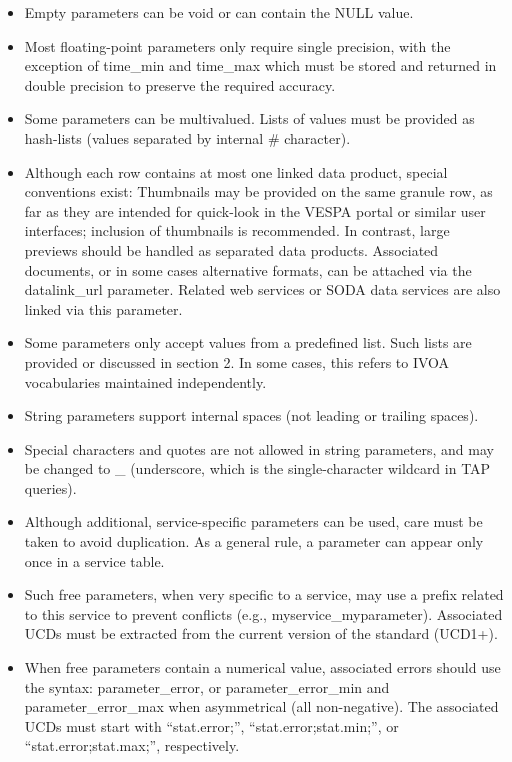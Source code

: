 \documentclass[11pt,a4paper]{ivoa}
\begin{document}
\begin{itemize}
\begin{itemize}
\item Empty parameters can be void or can contain the NULL value.

\item Most floating-point parameters only require single precision,
with the exception of time\_min and time\_max which must be stored and
returned in double precision to preserve the required accuracy.

\item Some parameters can be multivalued. Lists of values must be provided
as hash-lists (values separated by internal \# character).

\item Although each row contains at most one linked data product, special
conventions exist:
Thumbnails may be provided on the same granule row,
as far as they are intended for quick-look in the VESPA portal or
similar user interfaces; inclusion of thumbnails is recommended.
In contrast, large previews should be handled as separated data products.
Associated documents, or in some cases alternative formats, can be
attached via the datalink\_url parameter. Related web services or SODA
data services are also linked via this parameter.

\item Some parameters only accept values from a predefined list. Such
lists are provided or discussed in section 2. In some cases, this refers
to IVOA vocabularies maintained independently.

\item String parameters support internal spaces
(not leading or trailing spaces).

\item Special characters and quotes are not allowed in string parameters,
and may be changed to \_ (underscore, which is the single-character
wildcard in TAP queries).

\item Although additional, service-specific parameters can be used,
care must be taken to avoid duplication. As a general rule, a parameter
can appear only once in a service table.

\item Such free parameters, when very specific to a service,
may use a prefix related to this service to prevent conflicts
(e.g., myservice\_myparameter).
Associated UCDs must be extracted from the
current version of the standard (UCD1+).

\item When free parameters contain a numerical value, associated errors
should use the syntax: parameter\_error, or parameter\_error\_min
and parameter\_error\_max when asymmetrical (all non-negative). The
associated UCDs must start with ``stat.error;'', ``stat.error;stat.min;'',
or ``stat.error;stat.max;'', respectively.
\end{itemize}


\end{itemize}
\end{document}
